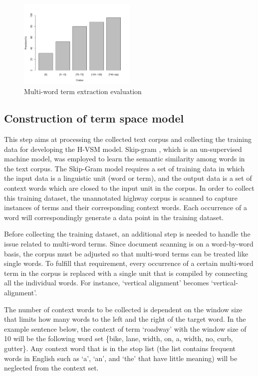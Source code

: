 \documentclass[Journal,InsideFigs, DoubleSpace]{ascelike} %
\begin{document}
\begin{figure}[t]
	\centering
	\includegraphics[width=0.5\textwidth]{Figure3_term_precision}
	\caption{Multi-word term extraction evaluation}
	\label{fig:term_precision}
\end{figure}
%
\subsection{Construction of term space model}
%
This step aims at processing the collected text corpus and collecting the training data for developing the H-VSM model. Skip-gram \cite{mikolov13a}, which is an un-supervised machine model, was employed to learn the semantic similarity among words in the text corpus. The Skip-Gram model requires a set of training data in which the input data is a linguistic unit (word or term), and the output data is a set of context words which are closed to the input unit in the corpus. In order to collect this training dataset, the unannotated highway corpus is scanned to capture instances of terms and their corresponding context words. Each occurrence of a word will correspondingly generate a data point in the training dataset.
\par
Before collecting the training dataset, an additional step is needed to handle the issue related to multi-word terms. Since document scanning is on a word-by-word basis, the corpus must be adjusted so that multi-word terms can be treated like single words. To fulfill that requirement, every occurrence of a certain multi-word term in the corpus is replaced with a single unit that is compiled by connecting all the individual words. For instance, `vertical alignment' becomes `vertical-alignment'.
\par
The number of context words to be collected is dependent on the window size that limits how many words to the left and the right of the target word. In the example sentence below, the context of term `roadway' with the window size of 10 will be the following word set \{bike, lane, width, on, a, width, no, curb, gutter\}. Any context word that is in the stop list (the list contains frequent words in English such as `a', `an', and `the' that have little meaning) will be neglected from the context set.
\end{document}
